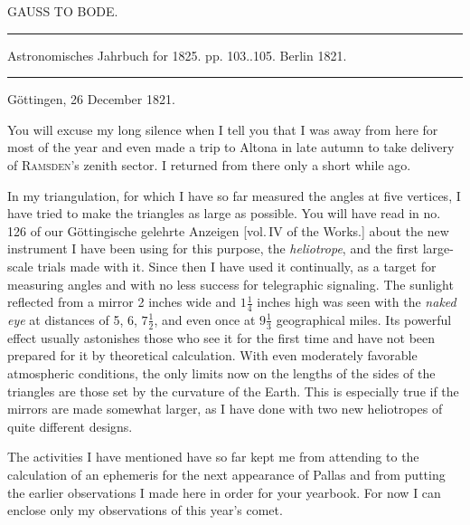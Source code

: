 \clearpage
{}
\hypertarget{native-444-part-lower}{}
\begin{center}
{\large GAUSS TO BODE.}

\noindent\rule{\linewidth}{0.4pt}

Astronomisches Jahrbuch for 1825. pp. 103..105. Berlin 1821.

\noindent\rule{\linewidth}{0.4pt}
\end{center}

\begin{flushright}
Göttingen, 26 December 1821.
\end{flushright}

You will excuse my long silence when I tell you that I was away from here for most of the year and even made a trip to Altona in late autumn to take delivery of \textsc{Ramsden}’s zenith sector. I returned from there only a short while ago.

In my triangulation, for which I have so far measured the angles at five vertices, I have tried to make the triangles as large as possible. You will have read in no. 126 of our Göttingische gelehrte Anzeigen [vol.\,IV of the Works.] about the new instrument I have been using for this purpose, the \emph{heliotrope}, and the first large-scale trials made with it. Since then I have used it continually, as a target for measuring angles and with no less success for telegraphic signaling. The sunlight reflected from a mirror 2 inches wide and $1\tfrac{1}{4}$ inches high was seen with the \emph{naked eye} at distances of 5, 6, $7\tfrac{1}{2}$, and even once at $9\tfrac{1}{3}$ geographical miles. Its powerful effect usually astonishes those who see it for the first time and have not been prepared for it by theoretical calculation. With even moderately favorable atmospheric conditions, the only limits now on the lengths of the sides of the triangles are those set by the curvature of the Earth. This is especially true if the mirrors are made somewhat larger, as I have done with two new heliotropes of quite different designs.

The activities I have mentioned have so far kept me from attending to the calculation of an ephemeris for the next appearance of Pallas and from putting the earlier observations I made here in order for your yearbook. For now I can enclose only my observations of this year’s comet.

